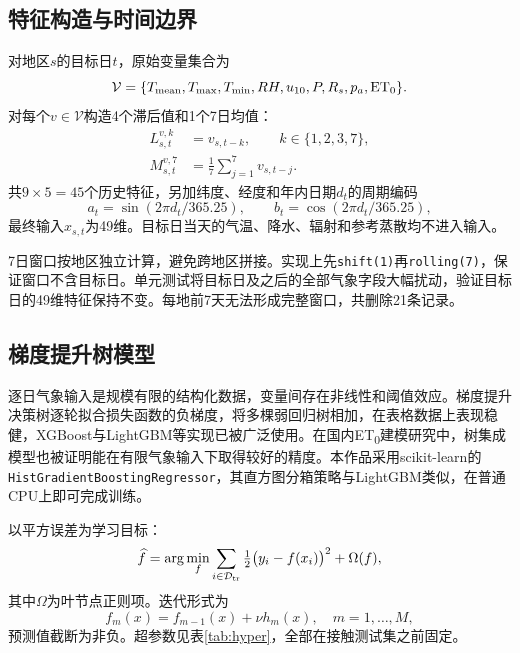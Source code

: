 \subsection{特征构造与时间边界}
对地区$s$的目标日$t$，原始变量集合为
\begin{equation}
\mathcal V=\{T_{\rm mean},T_{\max},T_{\min},RH,u_{10},P,R_s,p_a,\mathrm{ET}_0\}.
\end{equation}
对每个$v\in\mathcal V$构造4个滞后值和1个7日均值：
\begin{align}
L_{s,t}^{v,k}&=v_{s,t-k},\qquad k\in\{1,2,3,7\},\\
M_{s,t}^{v,7}&=\frac{1}{7}\sum_{j=1}^{7}v_{s,t-j}.
\end{align}
共$9\times5=45$个历史特征，另加纬度、经度和年内日期$d_t$的周期编码
\begin{equation}
a_t=\sin(2\pi d_t/365.25),\qquad b_t=\cos(2\pi d_t/365.25),
\end{equation}
最终输入$x_{s,t}$为49维。目标日当天的气温、降水、辐射和参考蒸散均不进入输入。

7日窗口按地区独立计算，避免跨地区拼接。实现上先\texttt{shift(1)}再\texttt{rolling(7)}，保证窗口不含目标日。单元测试将目标日及之后的全部气象字段大幅扰动，验证目标日的49维特征保持不变。每地前7天无法形成完整窗口，共删除21条记录。

\subsection{梯度提升树模型}
逐日气象输入是规模有限的结构化数据，变量间存在非线性和阈值效应。梯度提升决策树逐轮拟合损失函数的负梯度，将多棵弱回归树相加\cite{friedman}，在表格数据上表现稳健，XGBoost与LightGBM等实现已被广泛使用\cite{xgb,lgbm}。在国内ET\textsubscript{0}建模研究中，树集成模型也被证明能在有限气象输入下取得较好的精度\cite{fan,feng}。本作品采用scikit-learn的\texttt{HistGradientBoostingRegressor}\cite{sklearn}，其直方图分箱策略与LightGBM类似，在普通CPU上即可完成训练。

以平方误差为学习目标：
\begin{equation}
\widehat f=\arg\min_f\sum_{i\in\mathcal D_{\rm tr}}\tfrac12\bigl(y_i-f(x_i)\bigr)^2+\Omega(f),
\end{equation}
其中$\Omega$为叶节点正则项。迭代形式为
\begin{equation}
f_m(x)=f_{m-1}(x)+\nu h_m(x),\quad m=1,\ldots,M,
\end{equation}
预测值截断为非负。超参数见表\ref{tab:hyper}，全部在接触测试集之前固定。

